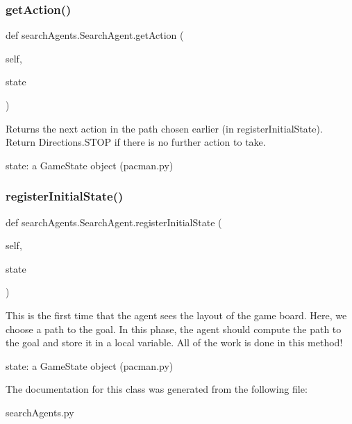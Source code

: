 \subsubsection{\texorpdfstring{get\+Action()}{getAction()}}
{\footnotesize\ttfamily def search\+Agents.\+Search\+Agent.\+get\+Action (\begin{DoxyParamCaption}\item[{}]{self,  }\item[{}]{state }\end{DoxyParamCaption})}

\begin{DoxyVerb}Returns the next action in the path chosen earlier (in registerInitialState).  Return
Directions.STOP if there is no further action to take.

state: a GameState object (pacman.py)
\end{DoxyVerb}
 \mbox{\label{classsearch_agents_1_1_search_agent_ab6fba6e09d2d604f1f1f403dc41ecfcc}} 
\subsubsection{\texorpdfstring{register\+Initial\+State()}{registerInitialState()}}
{\footnotesize\ttfamily def search\+Agents.\+Search\+Agent.\+register\+Initial\+State (\begin{DoxyParamCaption}\item[{}]{self,  }\item[{}]{state }\end{DoxyParamCaption})}

\begin{DoxyVerb}This is the first time that the agent sees the layout of the game board. Here, we
choose a path to the goal.  In this phase, the agent should compute the path to the
goal and store it in a local variable.  All of the work is done in this method!

state: a GameState object (pacman.py)
\end{DoxyVerb}
 

The documentation for this class was generated from the following file\+:\begin{DoxyCompactItemize}
\item 
search\+Agents.\+py\end{DoxyCompactItemize}
